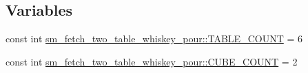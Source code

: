 \subsection*{Variables}
\begin{DoxyCompactItemize}
\item 
const int \hyperlink{namespacesm__fetch__two__table__whiskey__pour_a17b0c4eed9dc45b1cdf81aeb8cab3fda}{sm\+\_\+fetch\+\_\+two\+\_\+table\+\_\+whiskey\+\_\+pour\+::\+T\+A\+B\+L\+E\+\_\+\+C\+O\+U\+NT} = 6
\item 
const int \hyperlink{namespacesm__fetch__two__table__whiskey__pour_ab6321f5657e6b4b621a9b084f81bdeb6}{sm\+\_\+fetch\+\_\+two\+\_\+table\+\_\+whiskey\+\_\+pour\+::\+C\+U\+B\+E\+\_\+\+C\+O\+U\+NT} = 2
\end{DoxyCompactItemize}
